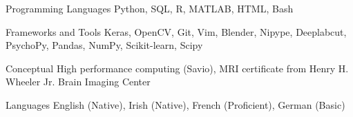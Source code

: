 

\begin{cvskills}

 \cvskill
  	{Programming Languages}
    {Python, SQL, R, MATLAB, HTML, Bash} %
  
 \cvskill
   {Frameworks and Tools}
   {Keras, OpenCV, Git, Vim, Blender, Nipype, Deeplabcut, PsychoPy, Pandas, NumPy, Scikit-learn, Scipy}
   
 \cvskill
   {Conceptual}
   {High performance computing (Savio), MRI certificate from Henry H. Wheeler Jr. Brain Imaging Center}
   
  \cvskill
   {Languages}
   {English (Native), Irish (Native), French (Proficient), German (Basic)}
    

\end{cvskills}
